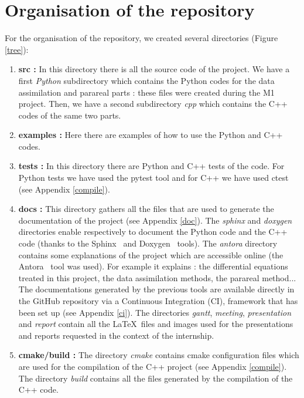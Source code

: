 \lstset{style=bash}

\section{Organisation of the repository}

	\begin{minipage}{0.65\linewidth}
		For the organisation of the repository, we created several directories (Figure \ref{tree}):
		\begin{enumerate}[label=\textbullet]
			\item \textbf{src :} In this directory there is all the source code of the project. We have a first \textit{Python} subdirectory which contains the Python codes for the data assimilation and parareal parts : these files were created during the M1 project. Then, we have a second subdirectory \textit{cpp} which contains the C++ codes of the same two parts.
			\item \textbf{examples :} Here there are examples of how to use the Python and C++ codes.
			\item \textbf{tests :} In this directory there are Python and C++ tests of the code. For Python tests we have used the pytest tool and for C++ we have used ctest (see Appendix \ref{compile}).
			\item \textbf{docs :} This directory gathers all the files that are used to generate the documentation of the project (see Appendix \ref{doc}). The \textit{sphinx} and \textit{doxygen} directories enable respectively to document the Python code and the C++ code (thanks to the Sphinx~\cite{sphinx_doc} and Doxygen~\cite{doxygen_doc} tools). The \textit{antora} directory contains some explanations of the project which are accessible online (the Antora~\cite{antora_doc} tool was used). For example it explains : the differential equations treated in this project, the data assimilation methods, the parareal method... The documentations generated by the previous tools are available directly in the GitHub repository via a Continuous Integration (CI), framework that has been set up (see Appendix \ref{ci}).
			The directories \textit{gantt}, \textit{meeting}, \textit{presentation} and \textit{report} contain all the \LaTeX ~files and images used for the presentations and reports requested in the context of the internship.
			\item \textbf{cmake/build :} The directory \textit{cmake} contains cmake configuration files which are used for the compilation of the C++ project (see Appendix \ref{compile}). The directory \textit{build} contains all the files generated by the compilation of the C++ code.
		\end{enumerate}
	\end{minipage} \qquad
